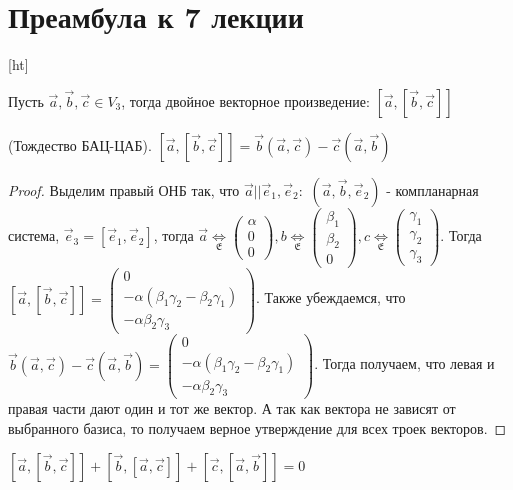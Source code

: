\section{Преамбула к 7 лекции}[ht]
\begin{definition}
	Пусть $\vec{a}, \vec{b}, \vec{c}\in V_3$, тогда двойное векторное произведение:
	\([\vec{a}, [\vec{b}, \vec{c}]]\)
\end{definition}
\begin{theorem}
	(Тождество БАЦ-ЦАБ). \([\vec a, [\vec b, \vec c]] = \vec b(\vec a, \vec c) - \vec c(\vec a, \vec b)\)
\end{theorem}

\begin{proof}
	Выделим правый ОНБ так, что \(\vec a || \vec e_1, \vec e_2:\) \((\vec a, \vec b, \vec e_2)\) - компланарная система, \(\vec e_3 = [\vec e_1, \vec e_2]\), тогда \(\vec a\underset{\mathfrak{E}}{\Longleftrightarrow} \begin{pmatrix}
		\alpha \\ 0 \\ 0
	\end{pmatrix}, 
	b\underset{\mathfrak{E}}{\Longleftrightarrow} \begin{pmatrix}
		\beta_1 \\ \beta_2 \\ 0
	\end{pmatrix}, 
	c\underset{\mathfrak{E}}{\Longleftrightarrow} \begin{pmatrix}
		\gamma_1 \\ \gamma_2 \\ \gamma_3
	\end{pmatrix}
	\). \newline Тогда \([\vec a, [\vec b, \vec c]] = \begin{pmatrix}
		0 \\ -\alpha(\beta_1\gamma_2-\beta_2\gamma_1) \\ -\alpha\beta_2\gamma_3
	\end{pmatrix}\). Также убеждаемся, что \(\vec b(\vec a, \vec c) - \vec c(\vec a, \vec b) = \begin{pmatrix}
		0 \\ -\alpha(\beta_1\gamma_2-\beta_2\gamma_1) \\ -\alpha\beta_2\gamma_3
	\end{pmatrix}\). Тогда получаем, что левая и правая части дают один и тот же вектор. А так как вектора не зависят от выбранного базиса, то получаем верное утверждение для всех троек векторов.
\end{proof}
\begin{corollary}
	\([\vec a, [\vec b, \vec c]] + [\vec b, [\vec a, \vec c]] + [\vec c, [\vec a, \vec b]] = 0\)
\end{corollary}
